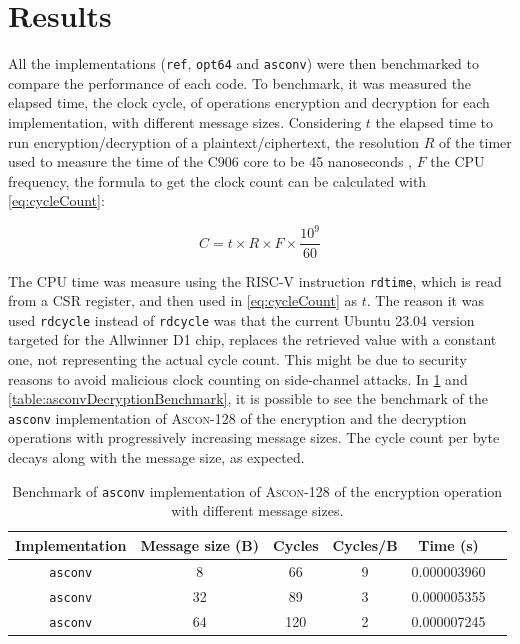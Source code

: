 \documentclass[11pt,twoside]{article}
\begin{document}
\section{Results}
\label{section:results}

All the implementations (\texttt{ref}, \texttt{opt64} and \texttt{asconv}) were then benchmarked to compare the performance of each code. To benchmark, it was measured the elapsed time, the clock cycle, of operations encryption and decryption for each implementation, with different message sizes. Considering $t$ the elapsed time to run encryption/decryption of a plaintext/ciphertext, the resolution $R$ of the timer used to measure the time of the C906 core to be 45 nanoseconds  \cite{10179399}, $F$ the CPU frequency, the formula to get the clock count can be calculated with \cref{eq:cycleCount}:

\begin{equation}
  C = t \times R \times F \times \frac{10^{9}}{60} \label{eq:cycleCount}
\end{equation}

The CPU time was measure using the RISC-V instruction \texttt{rdtime}, which is read from a CSR register, and then used in \cref{eq:cycleCount} as $t$. The reason it was used \texttt{rdcycle} instead of \texttt{rdcycle} was that the current Ubuntu 23.04 version targeted for the Allwinner D1 chip, replaces the retrieved value with a constant one, not representing the actual cycle count. This might be due to security reasons to avoid malicious clock counting on side-channel attacks. In \cref{table:asconvEncryptionBenchmark} and \cref{table:asconvDecryptionBenchmark}, it is possible to see the benchmark of the \texttt{asconv} implementation of \textsc{Ascon-128} of the encryption and the decryption operations with progressively increasing message sizes. The cycle count per byte decays along with the message size, as expected.

\begin{table}[h]
  \centering
  \begin{tabular}{|c|c|c|c|c|c|}
    \hline
    \textbf{Implementation} & \textbf{Message size (B)} &
    \textbf{Cycles}         & \textbf{Cycles/B}         & \textbf{Time (s)}                   \\ \hline

    \texttt{asconv}         & 8                         & 66                & 9 & 0.000003960 \\ \hline

    \texttt{asconv}         & 32                        & 89                & 3 & 0.000005355 \\ \hline

    \texttt{asconv}         & 64                        & 120               & 2 & 0.000007245 \\ \hline
  \end{tabular}
  \caption{Benchmark of \texttt{asconv} implementation of \textsc{Ascon-128} of the encryption operation with different message sizes.}
  \label{table:asconvEncryptionBenchmark}
\end{table}
\end{document}
